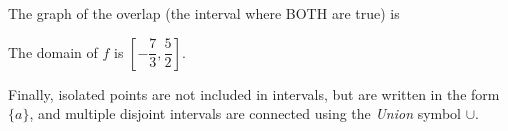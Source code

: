 \documentclass[nooutcomes]{ximera}
\begin{document}
\begin{example}
\begin{explanation}
			The graph of the overlap (the interval where BOTH are true) is
			\begin{image}
			\end{image}			
			
			The domain of $f$ is $\left[ -\dfrac{7}{3} , \dfrac{5}{2} \right]$.
		\end{explanation}
	\end{example}


	\begin{remark}
	Finally, isolated points are not included in intervals, but are written in the form $\{ a \}$, and multiple disjoint intervals are connected using the \emph{Union} symbol $\cup$.
	\end{remark}
\end{document}
